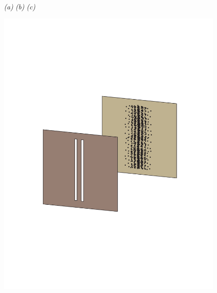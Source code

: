 \documentclass[3p,sort&compress,12pt]{elsarticle}
\begin{document}
\begin{figure}
{\footnotesize \emph{(a)} \hspace{5cm} \emph{(b)} \hspace{5cm} \emph{(c)} }

\centering
\includegraphics[scale=.33]{dsint_new3.pdf} \hspace{.7cm}

\end{figure}
\end{document}
